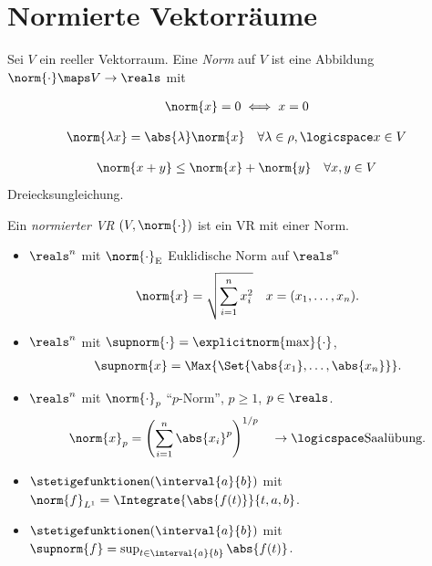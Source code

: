 \chapter{Normierte Vektorräume}
\begin{definition}\label{norm}
    Sei \( V \) ein reeller Vektorraum. Eine \emph{Norm} auf \( V \) ist eine Abbildung \( \norm{\cdot}\maps V\to \reals \) mit
    \begin{eigenschaftenenumerate}
        \item\label{norm:positiv_definit}
        \begin{align*}
            \norm{x}=0\iff x=0
        \end{align*}
        \item \label{norm:betrags_homogen}
        \begin{align*}
            \norm{\lambda x}=\abs{\lambda}\norm{x}\quad \forall \lambda\in \rho,\logicspace x\in V
        \end{align*}
        
        \item \label{norm:dreiecksungleichung}\begin{align*}
            \norm{x+y}\leq \norm{x}+\norm{y}\quad \forall x,y\in V
        \end{align*}
        Dreiecksungleichung.
    \end{eigenschaftenenumerate}
    Ein \emph{normierter VR} \( (V,\norm{\cdot}) \) ist ein VR mit einer Norm.
\end{definition}
\begin{beispiele*}
    \begin{itemize}
        \item \( \reals^n \) mit \( \norm{\cdot}_{\text{E}} \) Euklidische Norm auf \( \reals^n \)
        \begin{align*}
            \norm{x}=\sqrt{\sum_{i=1}^{n}x_i^2}\quad x=(x_{1},\dotsc,x_n).
        \end{align*}
        \item \( \reals^n \) mit \( \supnorm{\cdot}=\explicitnorm{\max}{\cdot} \),
        \begin{align*}
            \supnorm{x}=\Max{\Set{\abs{x_1},\dotsc,\abs{x_n}}}.
        \end{align*}
        \item \( \reals^n \) mit \( \norm{\cdot}_p \) \enquote{\( p \)-Norm}, \( p\geq 1 \), \( p\in \reals \).
        \begin{align*}
            \norm{x}_{p}=\left( \sum_{i=1}^{n}\abs{x_i}^p \right)^{1/p}\quad \to\logicspace  \text{Saalübung}.
        \end{align*}
        \item \( \stetigefunktionen(\interval{a}{b}) \) mit \( \norm{f}_{L^1}=\Integrate{\abs{f(t)}}{t,a,b} \). 
        \item \( \stetigefunktionen(\interval{a}{b}) \) mit \( \supnorm{f}=\sup_{t\in \interval{a}{b}}\abs{f(t)} \). 
    \end{itemize}
\end{beispiele*}

